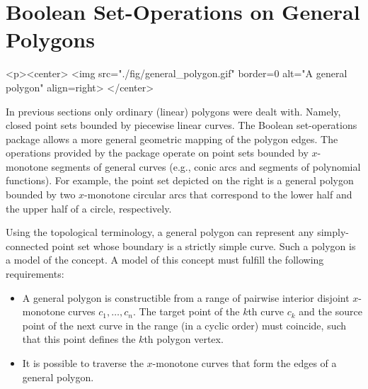 \section{Boolean Set-Operations on General Polygons\label{bso_sec:bso_gen}}

\lcTex{%
  \setlength{\BooleanSetOpsWidthRight}{1.4cm}
  \setlength{\BooleanSetOpsWidthLeft}{\BooleanSetOpsWidthLineReal}
  \addtolength{\BooleanSetOpsWidthLeft}{-\BooleanSetOpsWidthRight}
  \begin{minipage}{\BooleanSetOpsWidthLeft}
}
\label{fig:general_polygon}
\begin{ccHtmlOnly}
  <p><center>
    <img src="./fig/general_polygon.gif" border=0 alt="A general polygon" align=right>
  </center>
\end{ccHtmlOnly}
In previous sections only ordinary (linear) polygons were dealt with. Namely, closed
point sets bounded by piecewise linear curves. The Boolean
set-operations package allows a more general geometric mapping of the
polygon edges. The operations provided by the package operate on point
sets bounded by $x$-monotone segments of general curves (e.g., conic
arcs and segments of polynomial functions). For example, the point set
depicted on the right is a general polygon bounded by two $x$-monotone
circular arcs that correspond to the lower half and the upper half of
a circle, respectively.

Using the topological terminology, a general polygon can represent any
simply-connected point set whose boundary is a strictly simple curve.
Such a polygon is a model of the  concept. A model
of this concept must fulfill the following requirements:
\begin{itemize}
\item A general polygon is constructible from a range of pairwise
interior disjoint $x$-monotone curves $c_1, \ldots, c_n$. The target
point of the $k$th curve $c_k$ and the source point of the next curve
in the range (in a cyclic order) must coincide, such that this point
defines the $k$th polygon vertex. 
\item It is possible to traverse the $x$-monotone curves that form the
edges of a general polygon.
\end{itemize}

